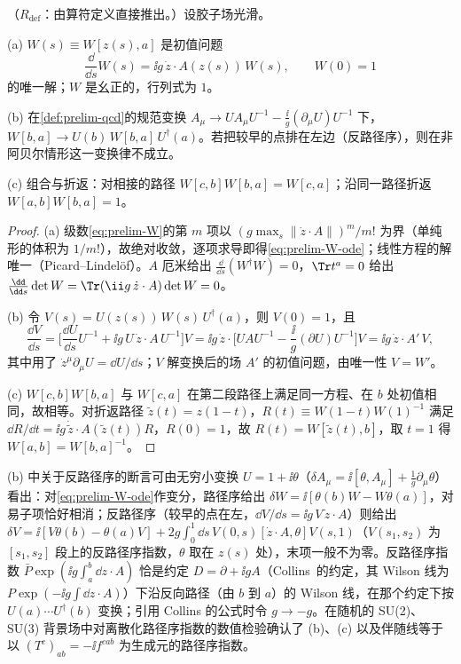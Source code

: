 \begin{proposition}\label{prop:prelim-wilson-covariance}
（$R_{\mathrm{def}}$：由算符定义直接推出。）设胶子场光滑。
\par
(a) $W(s)\equiv W[z(s),a]$ 是初值问题
\begin{equation}\label{eq:prelim-W-ode}
\frac{\dd}{\dd s}W(s)=\ii g\,\dot z\cdot A(z(s))\,W(s),\qquad W(0)=1
\end{equation}
的唯一解；$W$ 是幺正的，行列式为 $1$。
\par
(b) 在\cref{def:prelim-qcd}的规范变换 $A_\mu\to UA_\mu U^{-1}-\frac{\ii}{g}(\partial_\mu U)U^{-1}$ 下，$W[b,a]\to U(b)\,W[b,a]\,U^\dagger(a)$。若把较早的点排在左边（反路径序），则在非阿贝尔情形这一变换律不成立。
\par
(c) 组合与折返：对相接的路径 $W[c,b]W[b,a]=W[c,a]$；沿同一路径折返 $W[a,b]W[b,a]=1$。
\end{proposition}

\begin{proof}
(a) 级数\cref{eq:prelim-W}的第 $m$ 项以 $(g\max_s\|\dot z\cdot A\|)^m/m!$ 为界（单纯形的体积为 $1/m!$），故绝对收敛，逐项求导即得\cref{eq:prelim-W-ode}；线性方程的解唯一（Picard--Lindelöf）。$A$ 厄米给出 $\frac{\dd}{\dd s}(W^\dagger W)=0$，$\Tr t^a=0$ 给出 $\frac{\dd}{\dd s}\det W=\Tr(\ii g\,\dot z\cdot A)\det W=0$。

(b) 令 $V(s)=U(z(s))\,W(s)\,U^\dagger(a)$，则 $V(0)=1$，且
\[
\frac{\dd V}{\dd s}=\Big[\frac{\dd U}{\dd s}U^{-1}+\ii g\,U\,\dot z\cdot A\,U^{-1}\Big]V
=\ii g\,\dot z\cdot\Big[UAU^{-1}-\frac{\ii}{g}(\partial U)U^{-1}\Big]V=\ii g\,\dot z\cdot A'\,V ,
\]
其中用了 $\dot z^\mu\partial_\mu U=\dd U/\dd s$；$V$ 解变换后的场 $A'$ 的初值问题，由唯一性 $V=W'$。

(c) $W[c,b]W[b,a]$ 与 $W[c,a]$ 在第二段路径上满足同一方程、在 $b$ 处初值相同，故相等。对折返路径 $\tilde z(t)=z(1-t)$，$R(t)\equiv W(1-t)W(1)^{-1}$ 满足 $\dd R/\dd t=\ii g\,\dot{\tilde z}\cdot A(\tilde z(t))R$，$R(0)=1$，故 $R(t)=W[\tilde z(t),b]$，取 $t=1$ 得 $W[a,b]=W[b,a]^{-1}$。
\end{proof}

(b) 中关于反路径序的断言可由无穷小变换 $U=1+\ii\theta$（$\delta A_\mu=\ii[\theta,A_\mu]+\frac1g\partial_\mu\theta$）看出：对\cref{eq:prelim-W-ode}作变分，路径序给出 $\delta W=\ii[\theta(b)W-W\theta(a)]$，对易子项恰好相消；反路径序（较早的点在左，$\dd V/\dd s=\ii g\,V\,\dot z\cdot A$）则给出 $\delta V=\ii[V\theta(b)-\theta(a)V]+2g\int_0^1\dd s\,V(0,s)[\dot z\cdot A,\theta]V(s,1)$（$V(s_1,s_2)$ 为 $[s_1,s_2]$ 段上的反路径序指数，$\theta$ 取在 $z(s)$ 处），末项一般不为零。反路径序指数 $\bar P\exp(\ii g\int_a^b\dd z\cdot A)$ 恰是约定 $D=\partial+\ii gA$（Collins~\cite{Collins2011}的约定，其 Wilson 线为 $P\exp(-\ii g\int\dd z\cdot A)$）下沿反向路径（由 $b$ 到 $a$）的 Wilson 线，在那个约定下按 $U(a)\cdots U^\dagger(b)$ 变换；引用 Collins 的公式时令 $g\to-g$。在随机的 SU(2)、SU(3) 背景场中对离散化路径序指数的数值检验确认了 (b)、(c) 以及伴随线等于以 $(T^c)_{ab}=-\ii f^{cab}$ 为生成元的路径序指数。

